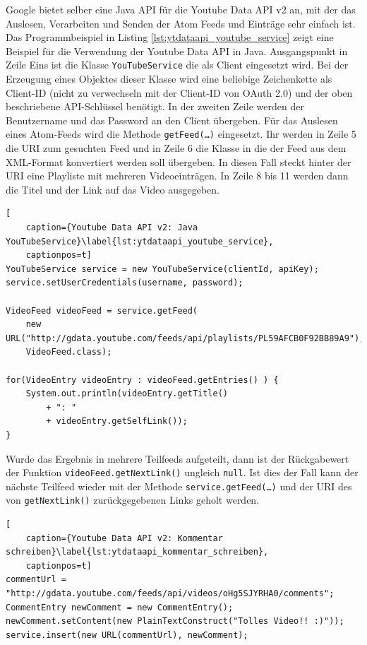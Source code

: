 Google bietet selber eine Java API für die Youtube Data API v2 an, mit der das Auslesen, Verarbeiten und Senden der Atom Feeds und Einträge sehr einfach ist. Das Programmbeispiel in Listing \ref{lst:ytdataapi_youtube_service} zeigt eine Beispiel für die Verwendung der Youtube Data API in Java. Ausgangspunkt in Zeile Eins ist die Klasse \texttt{YouTubeService} die als Client eingesetzt wird. Bei der Erzeugung eines Objektes dieser Klasse wird eine beliebige Zeichenkette als Client-ID (nicht zu verwechseln mit der Client-ID von OAuth 2.0) und der oben beschriebene API-Schlüssel benötigt. In der zweiten Zeile werden der Benutzername und das Password an den Client übergeben. Für das Auslesen eines Atom-Feeds wird die Methode \texttt{getFeed(\dots)} eingesetzt. Ihr werden in Zeile 5 die URI zum gesuchten Feed und in Zeile 6 die Klasse in die der Feed aus dem XML-Format konvertiert werden soll übergeben. In diesen Fall steckt hinter der URI eine Playliste mit mehreren Videoeinträgen. In Zeile 8 bis 11 werden dann die Titel und der Link auf das Video ausgegeben.

\begin{lstlisting}[
    caption={Youtube Data API v2: Java YouTubeService}\label{lst:ytdataapi_youtube_service},
    captionpos=t]
YouTubeService service = new YouTubeService(clientId, apiKey);
service.setUserCredentials(username, password);

VideoFeed videoFeed = service.getFeed(
    new URL("http://gdata.youtube.com/feeds/api/playlists/PL59AFCB0F92BB89A9"), 
    VideoFeed.class);

for(VideoEntry videoEntry : videoFeed.getEntries() ) {
    System.out.println(videoEntry.getTitle() 
        + ": " 
        + videoEntry.getSelfLink());
}
\end{lstlisting}

Wurde das Ergebnis in mehrere Teilfeeds aufgeteilt, dann ist der Rückgabewert der Funktion \texttt{videoFeed.getNextLink()} ungleich \texttt{null}. Ist dies der Fall kann der nächste Teilfeed wieder mit der Methode \texttt{service.getFeed(\dots)} und der URI des von \texttt{getNextLink()} zurückgegebenen Links geholt werden.

\begin{lstlisting}[
    caption={Youtube Data API v2: Kommentar schreiben}\label{lst:ytdataapi_kommentar_schreiben},
    captionpos=t]
commentUrl = "http://gdata.youtube.com/feeds/api/videos/oHg5SJYRHA0/comments";
CommentEntry newComment = new CommentEntry();
newComment.setContent(new PlainTextConstruct("Tolles Video!! :)"));
service.insert(new URL(commentUrl), newComment);
\end{lstlisting}

